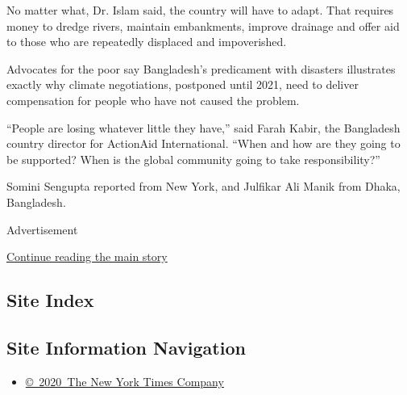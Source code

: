 No matter what, Dr. Islam said, the country will have to adapt. That
requires money to dredge rivers, maintain embankments, improve drainage
and offer aid to those who are repeatedly displaced and impoverished.

Advocates for the poor say Bangladesh's predicament with disasters
illustrates exactly why climate negotiations, postponed until 2021, need
to deliver compensation for people who have not caused the problem.

``People are losing whatever little they have,'' said Farah Kabir, the
Bangladesh country director for ActionAid International. ``When and how
are they going to be supported? When is the global community going to
take responsibility?''

Somini Sengupta reported from New York, and Julfikar Ali Manik from
Dhaka, Bangladesh.

Advertisement

\protect\hyperlink{after-bottom}{Continue reading the main story}

\hypertarget{site-index}{%
\subsection{Site Index}\label{site-index}}

\hypertarget{site-information-navigation}{%
\subsection{Site Information
Navigation}\label{site-information-navigation}}

\begin{itemize}
\tightlist
\item
  \href{https://help.nytimes.com/hc/en-us/articles/115014792127-Copyright-notice}{©~2020~The
  New York Times Company}
\end{itemize}


